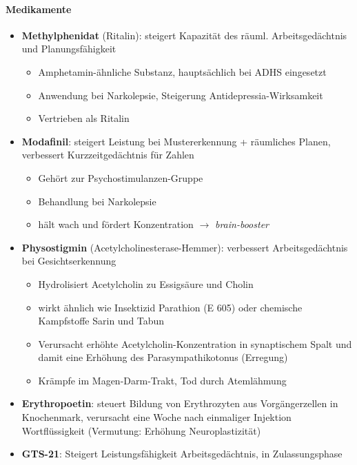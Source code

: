 \paragraph{Medikamente}
\begin{itemize}
  \item \textbf{Methylphenidat} (Ritalin): steigert Kapazität des räuml. Arbeitsgedächtnis und Planungsfähigkeit
  \begin{itemize}
    \item Amphetamin-ähnliche Substanz, hauptsächlich bei ADHS eingesetzt
    \item Anwendung bei Narkolepsie, Steigerung Antidepressia-Wirksamkeit
    \item Vertrieben als Ritalin
  \end{itemize}
  \item \textbf{Modafinil}: steigert Leistung bei Mustererkennung + räumliches Planen, verbessert Kurzzeitgedächtnis für Zahlen
  \begin{itemize}
    \item Gehört zur Psychostimulanzen-Gruppe
    \item Behandlung bei Narkolepsie
    \item hält wach und fördert Konzentration \( \to \) \emph{brain-booster}
  \end{itemize}
  \item \textbf{Physostigmin} (Acetylcholinesterase-Hemmer): verbessert Arbeitsgedächtnis bei Gesichtserkennung
  \begin{itemize}
    \item Hydrolisiert Acetylcholin zu Essigsäure und Cholin
    \item wirkt ähnlich wie Insektizid Parathion (E 605) oder chemische Kampfstoffe Sarin und Tabun
    \item Verursacht erhöhte Acetylcholin-Konzentration in synaptischem Spalt und damit eine Erhöhung des Parasympathikotonus (Erregung)
    \item Krämpfe im Magen-Darm-Trakt, Tod durch Atemlähmung
  \end{itemize}
  \item \textbf{Erythropoetin}: steuert Bildung von Erythrozyten aus Vorgängerzellen in Knochenmark, verursacht eine Woche nach einmaliger Injektion Wortflüssigkeit (Vermutung: Erhöhung Neuroplastizität)
  \item \textbf{GTS-21}: Steigert Leistungsfähigkeit Arbeitsgedächtnis, in Zulassungsphase
\end{itemize}